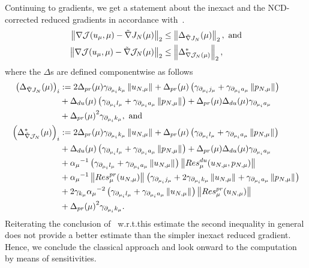 Continuing to gradients, we get a statement about the inexact and the NCD-corrected reduced gradients in accordance with~\cite[Proposition 3.8]{Keil2021}.
\begin{align*}
    \norm[2]{\nabla \mathcal{J}(u_\mu, \mu) - \tilde{\nabla} J_N(\mu)} &\leq \norm[2]{\Delta_{\tilde{\nabla} J_N}(\mu)}, \text{ and} \\
    \norm[2]{\nabla \mathcal{J}(u_\mu, \mu) - \tilde{\nabla} \mathcal{J}_N(\mu)} &\leq \norm[2]{\Delta_{\nabla \mathcal{J}_N (\mu)}^*},
\end{align*}
where the $\Delta$s are defined componentwise as follows
\begin{align*}
    {\left( \Delta_{\tilde{\nabla} J_N}(\mu) \right)}_i &:= 2 \Delta_{pr}(\mu) \gamma_{\partial_{\mu_i} k_\mu} \norm{u_{N, \mu}} + \Delta_{pr}(\mu) \left( \gamma_{\partial_{\mu_i} j_\mu} + \gamma_{\partial_{\mu_i} a_\mu} \norm{p_{N, \mu}} \right) \\
    &+ \Delta_{du}(\mu) \left( \gamma_{\partial_{\mu_i} l_\mu} + \gamma_{\partial_{\mu_i} a_\mu} \norm{p_{N, \mu}} \right) + \Delta_{pr}(\mu) \Delta_{du}(\mu) \gamma_{\partial_{\mu_i} a_\mu} \\
    &+ {\Delta_{pr}(\mu)}^2 \gamma_{\partial_{\mu_i} k_\mu}, \text{ and} \\
    {\left( \Delta_{\tilde{\nabla} \mathcal{J}_N}^*(\mu) \right)}_i &:= 2 \Delta_{pr}(\mu) \gamma_{\partial_{\mu_i} k_\mu} \norm{u_{N, \mu}} + \Delta_{pr}(\mu) \left( \gamma_{\partial_{\mu_i} l_\mu} + \gamma_{\partial_{\mu_i} a_\mu} \norm{p_{N, \mu}} \right) \\
    &+ \Delta_{du}(\mu) \left( \gamma_{\partial_{\mu_i} l_\mu} + \gamma_{\partial_{\mu_i} a_\mu} \norm{p_{N, \mu}} \right) + \Delta_{pr}(\mu) \Delta_{du}(\mu) \gamma_{\partial_{\mu_i} a_\mu} \\
    &+ {\alpha_\mu}^{-1} \left( \gamma_{\partial_{\mu_i} l_\mu} + \gamma_{\partial_{\mu_i} a_\mu} \norm{u_{N, \mu}} \right) \norm{Res_\mu^{du}(u_{N, \mu}, p_{N, \mu})} \\
    &+ {\alpha_\mu}^{-1} \norm{Res_\mu^{pr}(u_{N, \mu})} \left( \gamma_{\partial_{\mu_i} j_\mu} + 2 \gamma_{\partial_{\mu_i} k_\mu} \norm{u_{N, \mu}} + \gamma_{\partial_{\mu_i} a_\mu} \norm{p_{N, \mu}} \right) \\
    &+ 2 \gamma_{k_\mu} {\alpha_\mu}^{-2} \left( \gamma_{\partial_{\mu_i} l_\mu} + \gamma_{\partial_{\mu_i} a_\mu} \norm{u_{N, \mu}} \right) \norm{Res_\mu^{pr}(u_{N, \mu})} \\
    &+ {\Delta_{pr}(\mu)}^2 \gamma_{\partial_{\mu_i} k_\mu}. \\
\end{align*}
Reiterating the conclusion of~\cite{Keil2021} w.r.t.\@ this estimate the second inequality in general does not provide a better estimate than the simpler inexact reduced gradient.
Hence, we conclude the classical approach and look onward to the computation by means of sensitivities.

